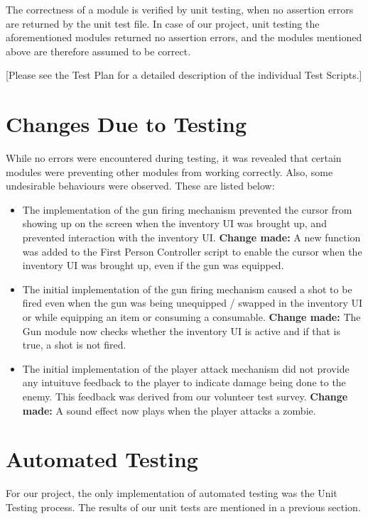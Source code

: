 \documentclass[12pt, titlepage]{article}
\begin{document}
The correctness of a module is verified by unit testing, when no assertion errors are returned by the unit test file. In case of our project, unit testing the aforementioned modules returned no assertion errors, and the modules mentioned above are therefore assumed to be correct.

[Please see the Test Plan for a detailed description of the individual Test Scripts.]
\section{Changes Due to Testing}

While no errors were encountered during testing, it was revealed that certain modules were preventing other modules from working correctly. Also, some undesirable behaviours were observed. These are listed below:

\begin{itemize}
	\item The implementation of the gun firing mechanism prevented the cursor from showing up on the screen when the inventory UI was brought up, and prevented interaction with the inventory UI.\newline
	\textbf{Change made: } A new function was added to the First Person Controller script to enable the cursor when the inventory UI was brought up, even if the gun was equipped.
	\item The initial implementation of the gun firing mechanism caused a shot to be fired even when the gun was being unequipped / swapped in the inventory UI or while equipping an item or consuming a consumable.\newline
	\textbf{Change made: } The Gun module now checks whether the inventory UI is active and if that is true, a shot is not fired.
	\item The initial implementation of the player attack mechanism did not provide any intuituve feedback to the player to indicate damage being done to the enemy. This feedback was derived from our volunteer test survey. \newline
	\textbf{Change made: } A sound effect now plays when the player attacks a zombie.
\end{itemize}
\section{Automated Testing}
		For our project, the only implementation of automated testing was the Unit Testing process. The results of our unit tests are mentioned in a previous section.
\end{document}
